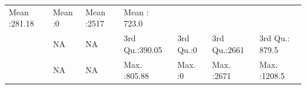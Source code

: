 \documentclass[]{article}
\begin{document}
\begin{longtable}[]{@{}lllllll@{}}
\begin{minipage}[t]{0.13\columnwidth}
Mean :281.18\strut
\end{minipage} & \begin{minipage}[t]{0.10\columnwidth}\raggedright\strut
Mean :0\strut
\end{minipage} & \begin{minipage}[t]{0.12\columnwidth}\raggedright\strut
Mean :2517\strut
\end{minipage} & \begin{minipage}[t]{0.13\columnwidth}\raggedright\strut
Mean : 723.0\strut
\end{minipage}\tabularnewline
\begin{minipage}[t]{0.03\columnwidth}\raggedright\strut
\strut
\end{minipage} & \begin{minipage}[t]{0.15\columnwidth}\raggedright\strut
NA\strut
\end{minipage} & \begin{minipage}[t]{0.15\columnwidth}\raggedright\strut
NA\strut
\end{minipage} & \begin{minipage}[t]{0.13\columnwidth}\raggedright\strut
3rd Qu.:390.05\strut
\end{minipage} & \begin{minipage}[t]{0.10\columnwidth}\raggedright\strut
3rd Qu.:0\strut
\end{minipage} & \begin{minipage}[t]{0.12\columnwidth}\raggedright\strut
3rd Qu.:2661\strut
\end{minipage} & \begin{minipage}[t]{0.13\columnwidth}\raggedright\strut
3rd Qu.: 879.5\strut
\end{minipage}\tabularnewline
\begin{minipage}[t]{0.03\columnwidth}\raggedright\strut
\strut
\end{minipage} & \begin{minipage}[t]{0.15\columnwidth}\raggedright\strut
NA\strut
\end{minipage} & \begin{minipage}[t]{0.15\columnwidth}\raggedright\strut
NA\strut
\end{minipage} & \begin{minipage}[t]{0.13\columnwidth}\raggedright\strut
Max. :805.88\strut
\end{minipage} & \begin{minipage}[t]{0.10\columnwidth}\raggedright\strut
Max. :0\strut
\end{minipage} & \begin{minipage}[t]{0.12\columnwidth}\raggedright\strut
Max. :2671\strut
\end{minipage} & \begin{minipage}[t]{0.13\columnwidth}\raggedright\strut
Max. :1208.5\strut
\end{minipage}\tabularnewline
\bottomrule
\end{longtable}
\end{document}
